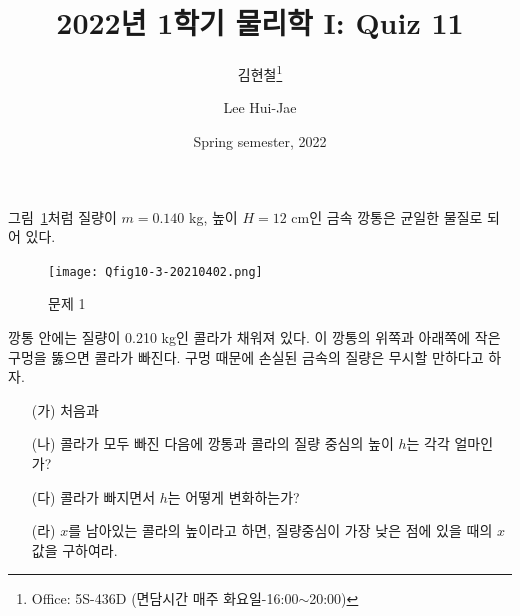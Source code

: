 \documentclass[floatfix,nofootinbib,superscriptaddress,fleqn]{revtex4-2}
\begin{document}
\title{\Large 2022년 1학기 물리학 I: Quiz 11}
\author{김현철\footnote{Office: 5S-436D (면담시간 매주
    화요일-16:00$\sim$20:00)}} 
\author{Lee Hui-Jae} 
\date{Spring semester, 2022}



\maketitle


그림~\ref{fig:1}처럼 질량이 $m=0.140$ 
kg, 높이 $H=12$ cm인 금속 깡통은 균일한 물질로 되어 있다. 
\begin{figure}[htp]
  \centering
  \texttt{[image: Qfig10-3-20210402.png]}  
  \caption{문제 1}
  \label{fig:1}
\end{figure}
깡통 안에는 질량이 0.210 kg인 콜라가 채워져 있다. 이 깡통의 위쪽과
아래쪽에 작은 구멍을 뚫으면 콜라가 빠진다. 구멍 때문에 손실된 금속의
질량은 무시할 만하다고 하자.
\begin{itemize}
\item[(가)] 처음과
\item[(나)] 콜라가 모두 빠진 다음에 깡통과 콜라의 질량 중심의 높이
  $h$는 각각 얼마인가?
\item[(다)] 콜라가 빠지면서 $h$는 어떻게 변화하는가?
\item[(라)] $x$를 남아있는 콜라의 높이라고 하면, 질량중심이 가장 낮은
  점에 있을 때의 $x$ 값을 구하여라. 
\end{itemize}
\end{document}
